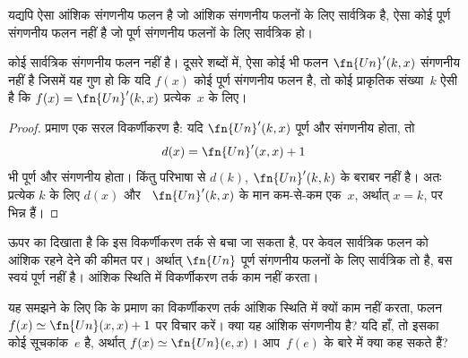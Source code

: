 \documentclass[../../../include/open-logic-section]{subfiles}
\begin{document}

यद्यपि ऐसा आंशिक संगणनीय फलन है जो आंशिक संगणनीय फलनों के लिए सार्वत्रिक
है, ऐसा कोई पूर्ण संगणनीय फलन नहीं है जो पूर्ण संगणनीय फलनों के लिए
सार्वत्रिक हो।

\begin{thm}
कोई सार्वत्रिक संगणनीय फलन नहीं है। दूसरे शब्दों में, ऐसा कोई भी फलन
$\fn{Un}'(k, x)$ संगणनीय नहीं है जिसमें यह गुण हो कि यदि $f(x)$ कोई
पूर्ण संगणनीय फलन है, तो कोई प्राकृतिक संख्या~$k$ ऐसी है कि
$f(x) = \fn{Un}'(k,x)$ प्रत्येक~$x$ के लिए।
\end{thm}

\begin{proof}
प्रमाण एक सरल विकर्णीकरण है: यदि $\fn{Un}'(k,x)$ पूर्ण और संगणनीय होता, तो
\[
d(x) = \fn{Un}'(x, x) + 1
\]
भी पूर्ण और संगणनीय होता। किंतु परिभाषा से $d(k)$,
$\fn{Un}'(k,k)$ के बराबर नहीं है। अतः प्रत्येक $k$ के लिए $d(x)$ और
~$\fn{Un}'(k, x)$ के मान कम-से-कम एक~$x$, अर्थात् $x = k$, पर भिन्न हैं।
\end{proof}

\begin{explain}
ऊपर का  दिखाता है कि इस विकर्णीकरण तर्क से बचा
जा सकता है, पर केवल सार्वत्रिक फलन को आंशिक रहने देने की कीमत पर। अर्थात्
$\fn{Un}$ पूर्ण संगणनीय फलनों के लिए सार्वत्रिक तो है, बस स्वयं पूर्ण
नहीं है। आंशिक स्थिति में विकर्णीकरण तर्क काम नहीं करता।
\end{explain}

\begin{prob}
  यह समझने के लिए कि  के प्रमाण का विकर्णीकरण तर्क
  आंशिक स्थिति में क्यों काम नहीं करता, फलन
  $f(x) \simeq \fn{Un}(x,x)+1$ पर विचार करें। क्या यह आंशिक संगणनीय है?
  यदि हाँ, तो इसका कोई सूचकांक~$e$ है, अर्थात् $f(x) \simeq
  \fn{Un}(e,x)$। आप~$f(e)$ के बारे में क्या कह सकते हैं?
\end{prob}
\end{document}

